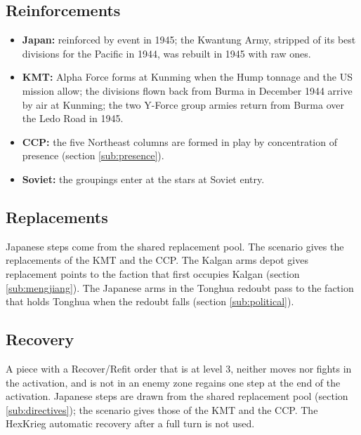\documentclass[11pt]{article}
\begin{document}
\subsection{Reinforcements}\label{sub:reinforcements}
\begin{itemize}
\item \textbf{Japan:} reinforced by event in 1945; the Kwantung Army, stripped of its best divisions for the Pacific in 1944, was rebuilt in 1945 with raw ones.
\item \textbf{KMT:} Alpha Force forms at Kunming when the Hump tonnage and the US mission allow; the divisions flown back from Burma in December 1944 arrive by air at Kunming; the two Y-Force group armies return from Burma over the Ledo Road in 1945.
\item \textbf{CCP:} the five Northeast columns are formed in play by concentration of presence (section \ref{sub:presence}).
\item \textbf{Soviet:} the groupings enter at the stars at Soviet entry.
\end{itemize}

\subsection{Replacements}
Japanese steps come from the shared replacement pool. The scenario gives the replacements of the KMT and the CCP. The Kalgan arms depot gives replacement points to the faction that first occupies Kalgan (section \ref{sub:mengjiang}). The Japanese arms in the Tonghua redoubt pass to the faction that holds Tonghua when the redoubt falls (section \ref{sub:political}).

\subsection{Recovery}\label{sub:recovery}
A piece with a Recover/Refit order that is at level 3, neither moves nor fights in the activation, and is not in an enemy zone regains one step at the end of the activation. Japanese steps are drawn from the shared replacement pool (section \ref{sub:directives}); the scenario gives those of the KMT and the CCP. The HexKrieg automatic recovery after a full turn is not used.

\end{document}
